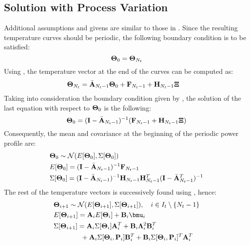 \subsection{Solution with Process Variation}
Additional assumptions and givens are similar to those in . Since the resulting temperature curves should be periodic, the following boundary condition is to be satisfied:
\begin{equation} \equlabel{dss-boundary}
  \vtemperature_0 = \vtemperature_{\stepcount}
\end{equation}
Using , the temperature vector at the end of the curves can be computed as:
\begin{align*}
  \mathbf{\Theta}_{N_t} & = \Bar{\mathbf{A}}_{N_t - 1} \mathbf{\Theta}_0 + \mathbf{F}_{N_t - 1} + \mathbf{H}_{N_t - 1} \mathbf{\Xi}
\end{align*}
Taking into consideration the boundary condition given by , the solution of the last equation with respect to $\mathbf{\Theta}_0$ is the following:
\[
\mathbf{\Theta}_0 = (\mathbf{I} - \Bar{\mathbf{A}}_{N_t - 1})^{-1} (\mathbf{F}_{N_t - 1} + \mathbf{H}_{N_t - 1} \mathbf{\Xi})
\]
Consequently, the mean and covariance at the beginning of the periodic power profile are:
\begin{align*}
  & \mathbf{\Theta}_0 \sim \mathcal{N}(E[\mathbf{\Theta}_0], \Sigma[\mathbf{\Theta}_0]) \\
  & E[\mathbf{\Theta}_0] = (\mathbf{I} - \Bar{\mathbf{A}}_{N_t - 1})^{-1} \mathbf{F}_{N_t - 1} \\
  & \Sigma[\mathbf{\Theta}_0] = (\mathbf{I} - \Bar{\mathbf{A}}_{N_t - 1})^{-1} \mathbf{H}_{N_t - 1} \mathbf{H}_{N_t - 1}^T (\mathbf{I} - \Bar{\mathbf{A}}_{N_t - 1}^T)^{-1}
\end{align*}
The rest of the temperature vectors is successively found using , hence:
\begin{align*}
  & \vtemperature_{i + 1} \sim \normal(\expectation{\vtemperature_{i + 1}}, \covariance{\vtemperature_{i + 1}}), \sep i \in \timeindex \setminus \{\stepcount - 1\} \\
  & \expectation{\vtemperature_{i + 1}} = \m{A}_i \expectation{\vtemperature_i} + \m{B}_i \vmean{i} \\
  & \covariance{\vtemperature_{i + 1}} = \m{A}_i \covariance{\vtemperature_i} \m{A}_i^T + \m{B}_i \ddeviation{i}^2 \m{B}_i^T \\
  & {} \qquad \qquad + \m{A}_i \covariance{\vtemperature_i, \vpower_i} \m{B}_i^T + \m{B}_i \covariance{\vtemperature_i, \vpower_i}^T \m{A}_i^T
\end{align*}

